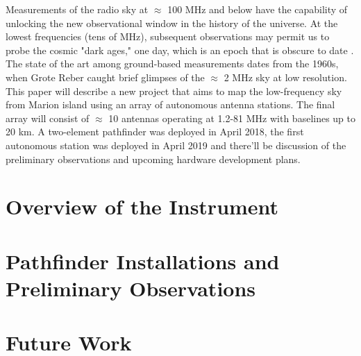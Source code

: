 \documentclass[12pt]{article}
\begin{document}
Measurements of the radio sky at $\approx$ 100 MHz and below have the capability of unlocking the new observational window in the history of the universe. At the lowest frequencies (tens of MHz), subsequent observations may permit us to probe the cosmic "dark ages," one day, which is an epoch that is obscure to date \citep{2019arXiv190710853C}. The state of the art among ground-based measurements dates from the 1960s, when Grote Reber caught brief glimpses of the $\approx$ 2 MHz sky at low resolution. This paper will describe a new project that aims to map the low-frequency sky from Marion island using an array of autonomous antenna stations. The final array will consist of  $\approx$ 10 antennas operating at 1.2-81 MHz with baselines up to 20 km. A two-element pathfinder was deployed in April 2018, the first autonomous station was deployed in April 2019 and there'll be discussion of the preliminary observations and upcoming hardware development plans.






\section*{Overview of the Instrument}
	\citep{2019arXiv190804296K}

\section*{Pathfinder Installations and Preliminary Observations}


\section*{Future Work}



\newpage		
		

\end{document}
